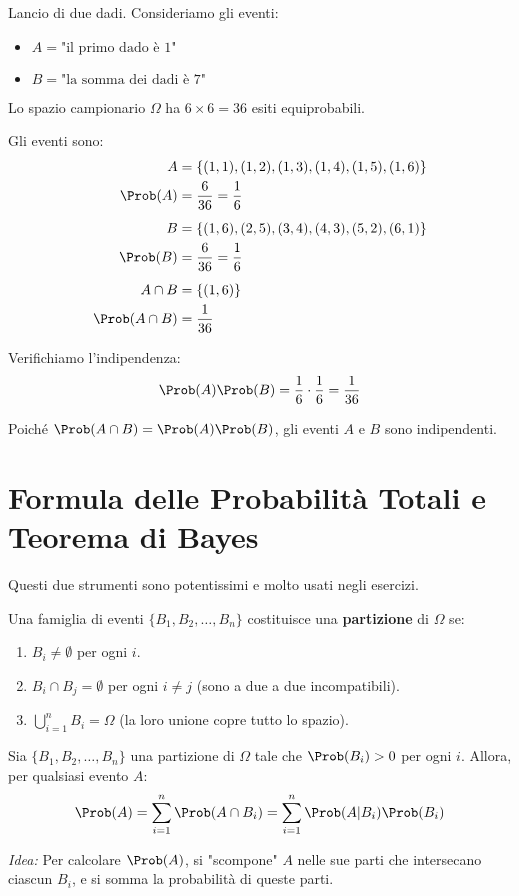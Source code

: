 \begin{example}
Lancio di due dadi. Consideriamo gli eventi:
\begin{itemize}
    \item $A = \text{"il primo dado è 1"}$
    \item $B = \text{"la somma dei dadi è 7"}$
\end{itemize}
Lo spazio campionario $\Omega$ ha $6 \times 6 = 36$ esiti equiprobabili.

Gli eventi sono:
\begin{align*}
    A &= \{(1,1), (1,2), (1,3), (1,4), (1,5), (1,6)\} \\
    \Prob(A) &= \frac{6}{36} = \frac{1}{6} \\[1ex]
    B &= \{(1,6), (2,5), (3,4), (4,3), (5,2), (6,1)\} \\
    \Prob(B) &= \frac{6}{36} = \frac{1}{6} \\[1ex]
    A \cap B &= \{(1,6)\} \\
    \Prob(A \cap B) &= \frac{1}{36}
\end{align*}

Verifichiamo l'indipendenza:
\[ \Prob(A)\Prob(B) = \frac{1}{6} \cdot \frac{1}{6} = \frac{1}{36} \]

Poiché $\Prob(A \cap B) = \Prob(A)\Prob(B)$, gli eventi $A$ e $B$ sono indipendenti.
\end{example}

\section{Formula delle Probabilità Totali e Teorema di Bayes}
Questi due strumenti sono potentissimi e molto usati negli esercizi.

\begin{definition}
Una famiglia di eventi $\{B_1, B_2, \dots, B_n\}$ costituisce una \textbf{partizione} di $\Omega$ se:
\begin{enumerate}
    \item $B_i \neq \emptyset$ per ogni $i$.
    \item $B_i \cap B_j = \emptyset$ per ogni $i \neq j$ (sono a due a due incompatibili).
    \item $\bigcup_{i=1}^n B_i = \Omega$ (la loro unione copre tutto lo spazio).
\end{enumerate}
\end{definition}

\begin{theorem}
Sia $\{B_1, B_2, \dots, B_n\}$ una partizione di $\Omega$ tale che $\Prob(B_i) > 0$ per ogni $i$. Allora, per qualsiasi evento $A$:
\[ \Prob(A) = \sum_{i=1}^n \Prob(A \cap B_i) = \sum_{i=1}^n \Prob(A|B_i) \Prob(B_i) \]
\end{theorem}
\textit{Idea:} Per calcolare $\Prob(A)$, si "scompone" $A$ nelle sue parti che intersecano ciascun $B_i$, e si somma la probabilità di queste parti.

